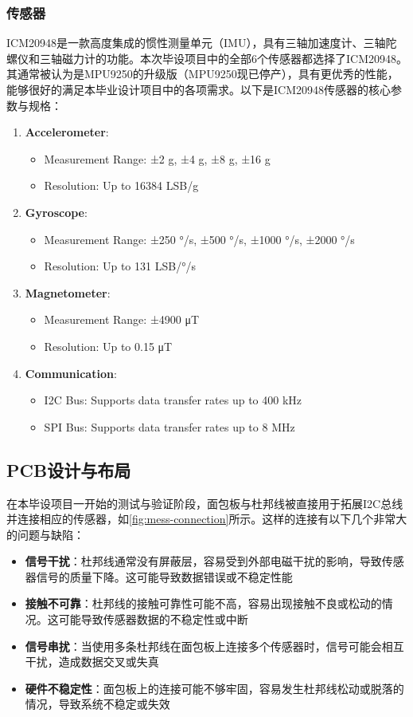 \subsubsection{传感器}
ICM20948是一款高度集成的惯性测量单元（IMU），具有三轴加速度计、三轴陀螺仪和三轴磁力计的功能。本次毕设项目中的全部6个传感器都选择了ICM20948。其通常被认为是MPU9250的升级版（MPU9250现已停产），具有更优秀的性能，能够很好的满足本毕业设计项目中的各项需求。以下是ICM20948传感器的核心参数与规格：
\begin{enumerate}
    \item {\bfseries Accelerometer}:
        \begin{itemize}
            \item Measurement Range: ±2 g, ±4 g, ±8 g, ±16 g
            \item Resolution: Up to 16384 LSB/g
        \end{itemize}
    \item {\bfseries Gyroscope}:
        \begin{itemize}
            \item Measurement Range: ±250 °/s, ±500 °/s, ±1000 °/s, ±2000 °/s
            \item Resolution: Up to 131 LSB/°/s
        \end{itemize}
    \item {\bfseries Magnetometer}:
        \begin{itemize}
            \item Measurement Range: ±4900 μT
            \item Resolution: Up to 0.15 μT
        \end{itemize}
    \item {\bfseries Communication}:
        \begin{itemize}
            \item I2C Bus: Supports data transfer rates up to 400 kHz
            \item SPI Bus: Supports data transfer rates up to 8 MHz
        \end{itemize}
\end{enumerate}


\subsection{PCB设计与布局}
在本毕设项目一开始的测试与验证阶段，面包板与杜邦线被直接用于拓展I2C总线并连接相应的传感器，如\autoref{fig:mess-connection}所示。这样的连接有以下几个非常大的问题与缺陷：
\begin{itemize}
    \item {\bfseries 信号干扰}：杜邦线通常没有屏蔽层，容易受到外部电磁干扰的影响，导致传感器信号的质量下降。这可能导致数据错误或不稳定性能
    \item {\bfseries 接触不可靠}：杜邦线的接触可靠性可能不高，容易出现接触不良或松动的情况。这可能导致传感器数据的不稳定性或中断
    \item {\bfseries 信号串扰}：当使用多条杜邦线在面包板上连接多个传感器时，信号可能会相互干扰，造成数据交叉或失真
    \item {\bfseries 硬件不稳定性}：面包板上的连接可能不够牢固，容易发生杜邦线松动或脱落的情况，导致系统不稳定或失效
\end{itemize}


